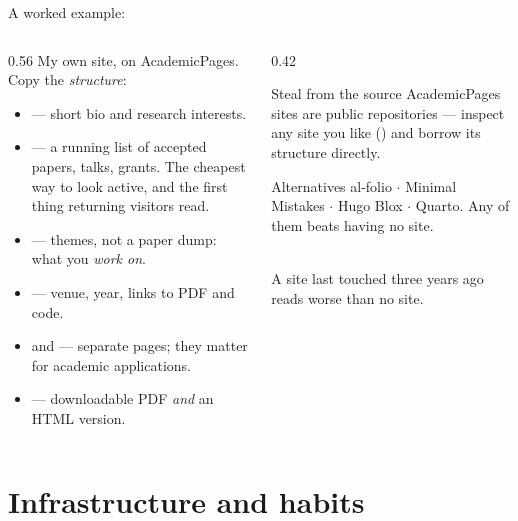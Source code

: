 \documentclass[aspectratio=169,11pt]{beamer}
\begin{document}
\begin{frame}{A worked example: }
\begin{columns}[T]
\begin{column}{0.56\textwidth}
My own site, on AcademicPages. Copy the \emph{structure}:
\footnotesize
\begin{itemize}
  \item {} --- short bio and research interests.
  \item {} --- a running list of accepted papers, talks, grants. The
        cheapest way to look active, and the first thing returning visitors
        read.
  \item {} --- themes, not a paper dump: what you \emph{work on}.
  \item {} --- venue, year, links to PDF and code.
  \item {} and  --- separate pages; they matter for
        academic applications.
  \item {} --- downloadable PDF \emph{and} an HTML version.
\end{itemize}
\end{column}
\begin{column}{0.42\textwidth}
\begin{block}{Steal from the source}
\footnotesize
AcademicPages sites are public repositories --- inspect any site you like
() and borrow its structure directly.
\end{block}
\begin{block}{Alternatives}
\footnotesize
al-folio $\cdot$ Minimal Mistakes $\cdot$ Hugo Blox $\cdot$ Quarto. Any of them
beats having no site.
\end{block}
\centering\footnotesize
{}\\ A site last touched three years ago
reads worse than no site.
\end{column}
\end{columns}
\end{frame}

\section{Infrastructure and habits}
\end{document}
